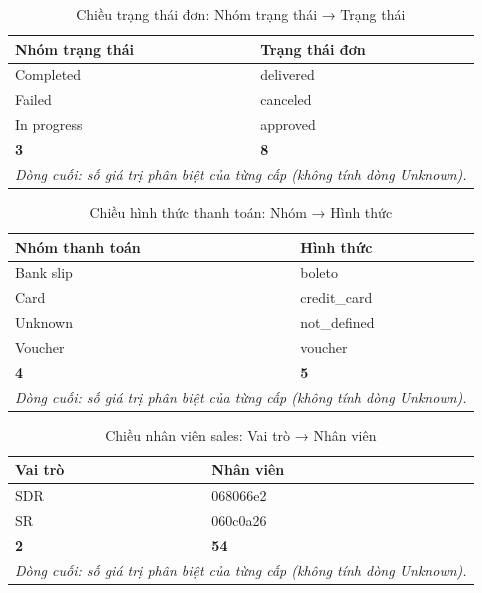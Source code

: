 \begin{table}[htbp]\centering\scriptsize\caption{Chiều trạng thái đơn: Nhóm trạng thái → Trạng thái}\label{tab:hier-dim-order-status}
\begin{tabular}{ll}\toprule
\textbf{Nhóm trạng thái} & \textbf{Trạng thái đơn}\\\midrule
Completed & delivered\\
Failed & canceled\\
In progress & approved\\
\midrule
\textbf{3} & \textbf{8}\\
\multicolumn{2}{l}{\footnotesize\emph{Dòng cuối: số giá trị phân biệt của từng cấp (không tính dòng Unknown).}}\\
\bottomrule\end{tabular}\end{table}

\begin{table}[htbp]\centering\scriptsize\caption{Chiều hình thức thanh toán: Nhóm → Hình thức}\label{tab:hier-dim-payment-type}
\begin{tabular}{ll}\toprule
\textbf{Nhóm thanh toán} & \textbf{Hình thức}\\\midrule
Bank slip & boleto\\
Card & credit\_card\\
Unknown & not\_defined\\
Voucher & voucher\\
\midrule
\textbf{4} & \textbf{5}\\
\multicolumn{2}{l}{\footnotesize\emph{Dòng cuối: số giá trị phân biệt của từng cấp (không tính dòng Unknown).}}\\
\bottomrule\end{tabular}\end{table}

\begin{table}[htbp]\centering\scriptsize\caption{Chiều nhân viên sales: Vai trò → Nhân viên}\label{tab:hier-dim-sales-rep}
\begin{tabular}{ll}\toprule
\textbf{Vai trò} & \textbf{Nhân viên}\\\midrule
SDR & 068066e2\\
SR & 060c0a26\\
\midrule
\textbf{2} & \textbf{54}\\
\multicolumn{2}{l}{\footnotesize\emph{Dòng cuối: số giá trị phân biệt của từng cấp (không tính dòng Unknown).}}\\
\bottomrule\end{tabular}\end{table}
